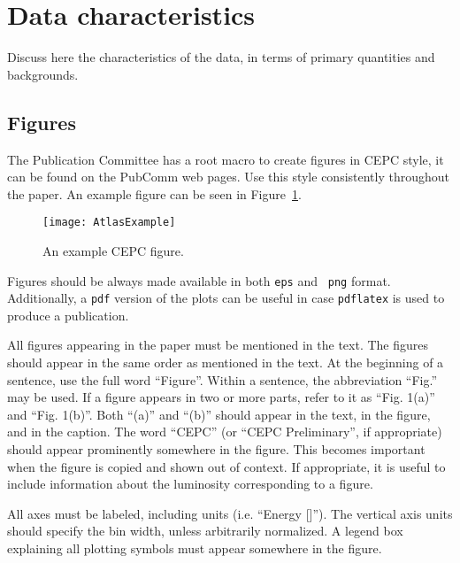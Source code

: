 \documentclass[11pt,a4paper]{cepcnote}
\begin{document}
%
%
\section{Data characteristics}

Discuss here the characteristics of the data, in terms of
primary quantities and backgrounds.

\subsection{Figures}

The Publication Committee has a root macro to create figures in
CEPC style, it can be found on the PubComm web pages.
Use this style consistently throughout the paper.
An example figure can be seen in Figure~\ref{fig:example}. 

\begin{figure}
  \centering
  \texttt{[image: AtlasExample]}
  \caption{An example CEPC figure.}
  \label{fig:example}
\end{figure}

Figures should be always made available in both {\tt eps} and {\tt
  png} format. Additionally, a {\tt pdf} version of the plots can be
useful in case \verb|pdflatex| is used to produce a publication.

All figures appearing in the paper must be mentioned in the text.
The figures should appear in the same order as mentioned in the text.
At the beginning of a sentence, use the full word ``Figure''.
Within a sentence, the abbreviation ``Fig.'' may be used.
If a figure appears in two or more parts, refer to it as
``Fig. 1(a)'' and ``Fig. 1(b)''. Both ``(a)'' and ``(b)'' should
appear in the text, in the figure, and in the caption.
The word ``CEPC'' (or ``CEPC Preliminary'', if appropriate) should
appear prominently somewhere in the figure. This becomes important when
the figure is copied and shown out of context. If appropriate, it
is useful to include information about the luminosity corresponding
to a figure.

All axes must be labeled, including units (i.e. ``Energy [\gev]'').
The vertical axis units should specify the bin width, unless
arbitrarily normalized. A legend box explaining all plotting symbols
must appear somewhere in the figure.
\end{document}
